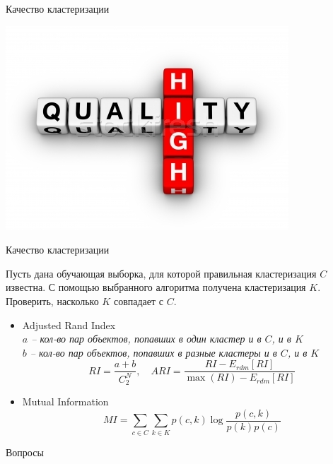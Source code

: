 \documentclass[aspectratio=169]{beamer}
\begin{document}

\begin{frame}

\begin{center}
{\Large Качество кластеризации}

\includegraphics[scale=0.3]{images/quality.jpg}
\end{center}

\end{frame}

\begin{frame}{Качество кластеризации}

Пусть дана обучающая выборка, для которой правильная кластеризация $C$ известна. С помощью выбранного алгоритма получена кластеризация $K$. Проверить, насколько $K$ совпадает с $C$.

\vspace{1em}
\begin{itemize}
\item Adjusted Rand Index \\
{\it \small
$a$ -- кол-во пар объектов, попавших в один кластер и в $C$, и в $K$ \\
$b$ -- кол-во пар объектов, попавших в разные кластеры и в $C$, и в $K$
\[
RI = \frac{a+b}{C^N_2}, \quad ARI = \frac{RI - E_{rdm}[RI]}{\max(RI) - E_{rdm}[RI]}
\]
}
\item Mutual Information \\
{\it \small
\[
MI = \sum_{c \in C} \sum_{k \in K} p(c, k) \log \frac{p(c, k)}{p(k)p(c)}
\]
}
\end{itemize}

\end{frame}

\begin{frame}[plain]
\begin{center}
{\Large Вопросы}
\end{center}
\end{frame}
\end{document}
